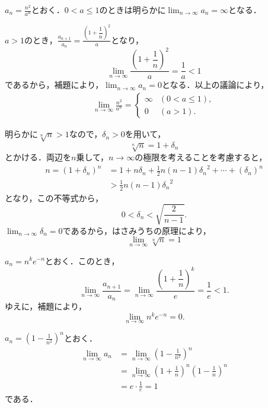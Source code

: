 \begin{tanswer}
    $a_n = \frac{n^2}{a^n}$とおく．$0<a \le 1$のときは明らかに$\lim_{n \to \infty} a_n=\infty$となる．\par
    $a>1$のとき，$\frac{a_{n+1}}{a_n} =\frac{\left(1+\dfrac{1}{n}\right)^2}{a}$となり，
    \[
        \lim_{n \to \infty} \frac{\left(1+\dfrac{1}{n}\right)^2}{a} = \frac{1}{a} <1
    \]
    であるから，補題により，$\lim_{n \to \infty} a_n =0$となる．以上の議論により，
    \begin{align*}
        \lim_{n \to \infty} \frac{n^2}{a^n}
        =
        \begin{cases}
            \infty & (0<a \le 1), \\
            0      & (a>1).
        \end{cases}
    \end{align*}
\end{tanswer}
\begin{tanswer}
    明らかに$\sqrt[n]{n} >1$なので，$\delta_n >0$を用いて，
    \[
        \sqrt[n]{n} = 1+ \delta_n
    \]
    とかける．両辺を$n$乗して，$n \to \infty$の極限を考えることを考慮すると，
    \begin{align*}
        n = (1+\delta_n)^n & =1 + n \delta_n + \frac{1}{2}n(n-1) {\delta_n}^2 + \cdots + (\delta_n)^n \\
                           & > \frac{1}{2}n(n-1) {\delta_n}^2
    \end{align*}
    となり，この不等式から，
    \[
        0<\delta_n < \sqrt{\frac{2}{n-1}}.
    \]
    $\lim_{n \to \infty} \delta_n =0$であるから，はさみうちの原理により，
    \[
        \lim_{n \to \infty} \sqrt[n]{n} =1
    \]
\end{tanswer}

\begin{tanswer}
    $a_n= n^k e^{-n}$とおく．このとき，
    \[
        \lim_{n \to \infty} \frac{a_{n+1}}{a_n} =  \lim_{n \to \infty} \frac{\left(1+\dfrac{1}{n}\right)^k}{e} =\frac{1}{e} <1.
    \]
    ゆえに，補題により，
    \[
        \lim_{n \to \infty} n^k e^{-n}=0.
    \]
\end{tanswer}

\begin{tanswer}
    $a_n =\left (1-\frac{1}{n^2}\right)^n$とおく．
    \begin{align*}
        \lim_{n \to \infty} a_n & =\lim_{n \to \infty} \left (1-\frac{1}{n^2}\right)^n                              \\
                                & = \lim_{n \to \infty} \left (1+\frac{1}{n}\right)^n \left (1-\frac{1}{n}\right)^n \\
                                & = e \cdot \frac{1}{e} =1
    \end{align*}
    である．
\end{tanswer}

